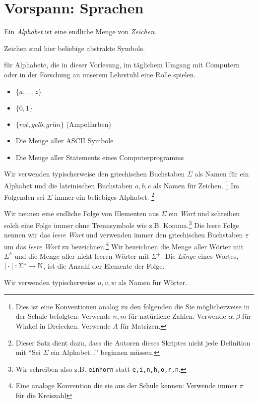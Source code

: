 \section[Vorspann: Sprachen]{Vorspann: Sprachen}
\begin{Def}[name={[Alphabet $\Sigma$]}]
	Ein \emph{Alphabet} ist eine endliche Menge von \emph{Zeichen}.
\end{Def} %
Zeichen sind hier beliebige abstrakte Symbole.

\newcommand{\aro}{\textit{rot}}
\newcommand{\age}{\textit{gelb}}
\newcommand{\agr}{\textit{grün}}

\begin{Bsp*} für Alphabete, die in dieser Vorlesung, im täglichem Umgang mit Computern oder in der Forschung an unserem Lehrstuhl eine Rolle spielen.
  \begin{itemize}
  \item $\{a,\dots,z\}$
  \item $\{0, 1\}$
  \item $\{\aro, \age, \agr\}$ (Ampelfarben)
  \item Die Menge aller ASCII Symbole
  \item Die Menge aller Statements eines Computerprogramms
  \end{itemize}
\end{Bsp*}
Wir verwenden typischerweise den griechischen Buchstaben $\Sigma$ als Namen für ein Alphabet und die lateinischen Buchstaben $a,b,c$ als Namen für Zeichen.
\footnote{Dies ist eine Konventionen analog zu den folgenden die Sie möglicherweise in der Schule befolgten: Verwende $n,m$ für natürliche Zahlen. Verwende $\alpha, \beta$ für Winkel in Dreiecken. Verwende $A$ für Matrizen.}
Im Folgenden sei $\Sigma$ immer ein beliebiges Alphabet.
\footnote{Dieser Satz dient dazu, dass die Autoren dieses Skriptes nicht jede Definition mit ``Sei $\Sigma$ ein Alphabet...'' beginnen müssen.}

\begin{Def}[name={[Wort $w$ über $\Sigma$]}]\label{def:1.2}
  Wir nennen eine endliche Folge von Elementen aus $\Sigma$ ein \emph{Wort}
  und schreiben solch eine Folge immer ohne Trennsymbole wie z.B. Komma.\footnote{Wir schreiben also z.B. \texttt{einhorn} statt \texttt{e,i,n,h,o,r,n}.}
  Die leere Folge nennen wir das \emph{leere Wort} und verwenden immer den griechischen Buchstaben $\varepsilon$ um das \emph{leere Wort} zu bezeichnen.\footnote{Eine analoge Konvention die sie aus der Schule kennen: Verwende immer $\pi$ für die Kreiszahl}
  Wir bezeichnen die Menge aller Wörter mit $\Sigma^*$ und die Menge aller nicht leeren Wörter mit $\Sigma^+$.
  Die \emph{Länge} eines Wortes, $|\cdot| : \Sigma^* \to \mathbb{N}$, ist die Anzahl der Elemente der Folge.
\end{Def}
  Wir verwenden typischerweise $u,v,w$ als Namen für Wörter.

